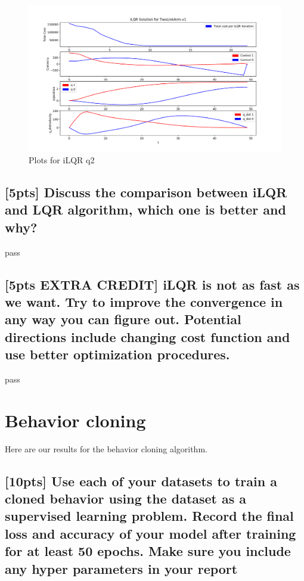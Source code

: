 \documentclass{article}
\begin{document}
\begin{figure}[H] \label{fig:ilqr_qn2}
  \centering
  \includegraphics[width=1.2\textwidth]{images/ilqr_qn2}
  \caption{Plots for iLQR q2}
\end{figure}

\subsection{[5pts] Discuss the comparison between iLQR and LQR algorithm, which one is better and why?}

pass

\subsection{[5pts EXTRA CREDIT] iLQR is not as fast as we want. Try to improve the convergence in any way you can figure out. Potential directions include changing cost function and use better optimization procedures.}

pass




\section{Behavior cloning}
Here are our results for the behavior cloning algorithm. 

\subsection{[10pts] Use each of your datasets to train a cloned behavior using the dataset as a supervised learning problem. Record the final loss and accuracy of your model after training for at least 50 epochs. Make sure you include any hyper parameters in your report}
\end{document}
